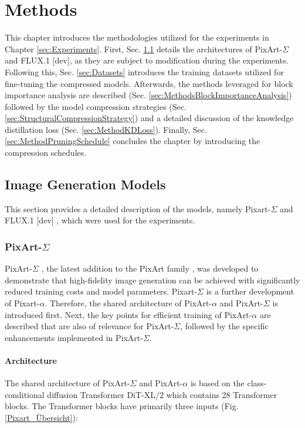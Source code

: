 \chapter{Methods}
This chapter introduces the methodologies utilized for the experiments in Chapter \ref{sec:Experiments}. First, Sec. \ref{sec:ImageGenerationModels} details the architectures of  PixArt-$\Sigma$ and FLUX.1 {[dev]}, as they are subject to modification during the experiments. Following this, Sec. \ref{sec:Datasets} introduces the training datasets utilized for fine-tuning the compressed models. Afterwards, the methods leveraged for block importance analysis are described (Sec. \ref{sec:MethodsBlockImportanceAnalysis}) followed by the model compression strategies (Sec. \ref{sec:StructuralCompressionStrategy}) and a detailed discussion of the knowledge distillation loss (Sec. \ref{sec:MethodKDLoss}). Finally, Sec.  \ref{sec:MethodPruningSchedule} concludes the chapter by introducing the compression schedules.

\section{Image Generation Models}
\label{sec:ImageGenerationModels}
This section provides a detailed description of the models, namely Pixart-$\Sigma$ \cite{Pixart_s} and FLUX.1 {[dev]} \cite{Flux}, which were used for the experiments.
\subsection{PixArt-$\Sigma$}
PixArt-$\Sigma$ \cite{Pixart_s}, the latest addition to the PixArt family \cite{Pixart_a, Pixart_d}, was developed to demonstrate that high-fidelity image generation can be achieved with significantly reduced training costs and model parameters. Pixart-$\Sigma$ is a further development of  Pixart-$\alpha$. Therefore, the shared architecture of PixArt-$\alpha$ and PixArt-$\Sigma$ is introduced first. Next, the key points for efficient training of PixArt-$\alpha$ are described that are also of relevance for PixArt-$\Sigma$, followed by the specific enhancements implemented in PixArt-$\Sigma$.

\subsubsection{Architecture }
The shared architecture of PixArt-$\Sigma$ and PixArt-$\alpha$ is based on the class-conditional diffusion Transformer \gls{DiT}-XL/2 \cite{DiT} which contains 28 Transformer blocks. The Transformer blocks have primarily three inputs (Fig. \ref{Pixart_Übersicht}):

